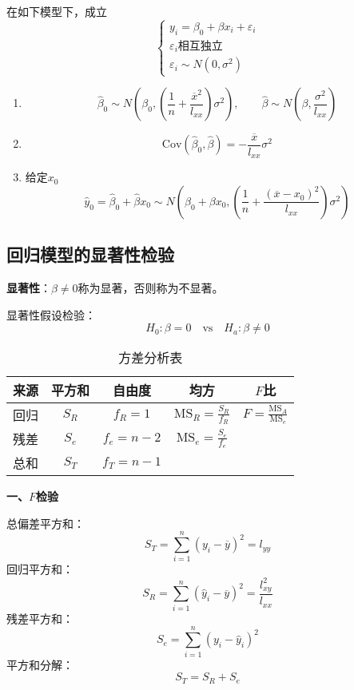 \documentclass[lang = cn, scheme = chinese, thmcnt = section]{elegantbook}
\begin{document}
\begin{theorem}
	在如下模型下，成立
	$$
	\begin{cases}
		y_i=\beta_0+\beta x_i+\varepsilon_i\\
		\varepsilon_i相互独立\\
		\varepsilon_i\sim N(0,\sigma^2)
	\end{cases}
	$$
	\begin{enumerate}
		\item 
		$$
		\hat{\beta}_0\sim N\left( \beta_0,\left(\frac{1}{n}+\frac{\overline{x}^2}{l_{xx}}\right)\sigma^2 \right),\qquad 
		\hat{\beta}\sim N\left( \beta,\frac{\sigma^2}{l_{xx}} \right)
		$$
		\item $$
		\mathrm{Cov}(\hat{\beta}_0,\hat{\beta})=-\frac{\overline{x}}{l_{xx}}\sigma^2
		$$
		\item 给定$x_0$
		$$
		\hat{y}_0=\hat{\beta}_0+\hat{\beta}x_0\sim N\left( \beta_0+\beta x_0,\left(\frac{1}{n}+\frac{(\overline{x}-x_0)^2}{l_{xx}}\right)\sigma^2 \right)
		$$
	\end{enumerate}
\end{theorem}

\subsection{回归模型的显著性检验}

\textbf{显著性}：$\beta\ne0$称为显著，否则称为不显著。

显著性假设检验：
$$
H_0:\beta=0\quad \mathrm{vs} \quad H_a:\beta\ne0
$$

\begin{table}[H]
	\centering
	\caption{方差分析表}
	\begin{tabular}{|c|c|c|c|c|}
		\hline
		来源 & 平方和 & 自由度 & 均方 & $F$比 \\ \hline
		回归 & $S_R$ & $f_R=1$ & $\mathrm{MS}_R=\frac{S_R}{f_R}$ & $F=\frac{\mathrm{MS}_A}{\mathrm{MS}_e}$ \\ \hline
		残差 & $S_e$ & $f_e=n-2$ & $\mathrm{MS}_e=\frac{S_e}{f_e}$ & \\ \hline
		总和 & $S_T$ & $f_T=n-1$ & & \\ \hline
	\end{tabular}
\end{table}

\textbf{一、$F$检验}

总偏差平方和：
$$
S_T=\sum_{i=1}^{n}(y_i-\overline{y})^2=l_{yy}
$$
回归平方和：
$$
S_R=\sum_{i=1}^{n}(\hat{y}_i-\overline{y})^2=\frac{l_{xy}^2}{l_{xx}}
$$
残差平方和：
$$
S_e=\sum_{i=1}^{n}(y_i-\hat{y}_i)^2
$$
平方和分解：
$$
S_T=S_R+S_e
$$
\end{document}
